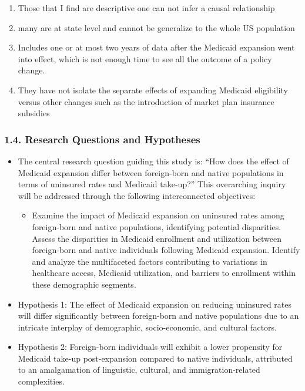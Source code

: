 \documentclass[
]{article}
\providecommand{\tightlist}{%
  \setlength{\itemsep}{0pt}\setlength{\parskip}{0pt}}
\begin{document}
\begin{enumerate}
\def\labelenumi{\arabic{enumi}.}
\tightlist
\item
  Those that I find are descriptive one can not infer a causal
  relationship
\item
  many are at state level and cannot be generalize to the whole US
  population
\item
  Includes one or at most two years of data after the Medicaid expansion
  went into effect, which is not enough time to see all the outcome of a
  policy change.
\item
  They have not isolate the separate effects of expanding Medicaid
  eligibility versus other changes such as the introduction of market
  plan insurance subsidies
\end{enumerate}

\hypertarget{research-questions-and-hypotheses}{%
\subsubsection{1.4. Research Questions and
Hypotheses}\label{research-questions-and-hypotheses}}

\begin{itemize}
\tightlist
\item
  The central research question guiding this study is: ``How does the
  effect of Medicaid expansion differ between foreign-born and native
  populations in terms of uninsured rates and Medicaid take-up?'' This
  overarching inquiry will be addressed through the following
  interconnected objectives:

  \begin{itemize}
  \tightlist
  \item
    Examine the impact of Medicaid expansion on uninsured rates among
    foreign-born and native populations, identifying potential
    disparities. Assess the disparities in Medicaid enrollment and
    utilization between foreign-born and native individuals following
    Medicaid expansion. Identify and analyze the multifaceted factors
    contributing to variations in healthcare access, Medicaid
    utilization, and barriers to enrollment within these demographic
    segments.
  \end{itemize}
\item
  Hypothesis 1: The effect of Medicaid expansion on reducing uninsured
  rates will differ significantly between foreign-born and native
  populations due to an intricate interplay of demographic,
  socio-economic, and cultural factors.
\item
  Hypothesis 2: Foreign-born individuals will exhibit a lower propensity
  for Medicaid take-up post-expansion compared to native individuals,
  attributed to an amalgamation of linguistic, cultural, and
  immigration-related complexities.
\end{itemize}
\end{document}

